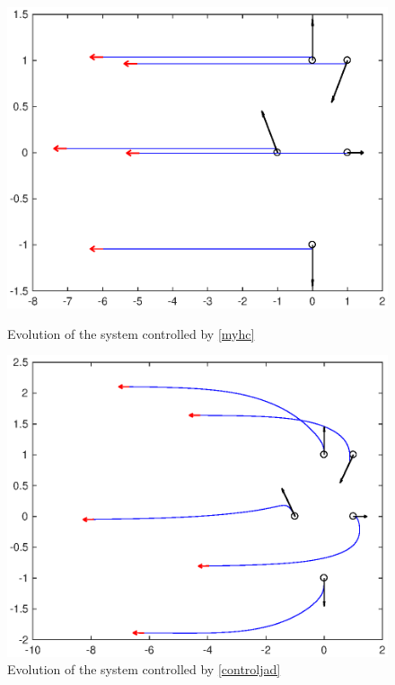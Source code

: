 \documentclass[a4paper, english]{article}
\begin{document}
  \begin{figure}[ht]
    \begin{minipage}[b]{0.5\textwidth}
      \includegraphics[width=\textwidth]{figures/my_h_ev.eps}
      \caption{Evolution of the system controlled by \eqref{myhc}}
      \label{my_h_ev}
    \end{minipage}
    \hfill
    \begin{minipage}[b]{0.5\textwidth}
      \includegraphics[width=\textwidth]{figures/jad_h_ev.eps}
      \caption{Evolution of the system controlled by \eqref{controljad}}
      \label{jad_h_ev}
    \end{minipage}
  \end{figure}
\end{document}
